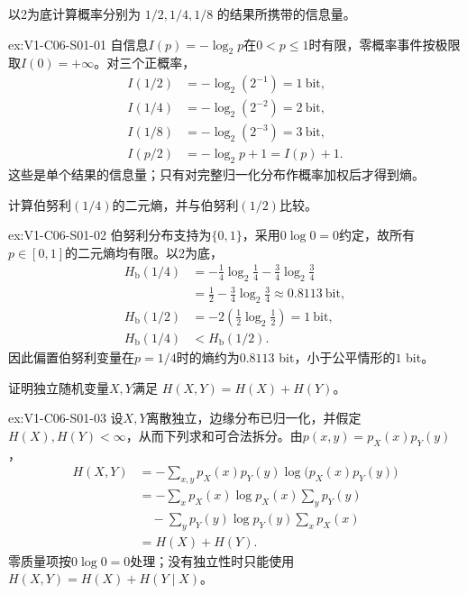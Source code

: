 \begin{SLChapterExercisePairSection}

\begin{exercise}\label{ex:V1-C06-S01-01}
以2为底计算概率分别为 $1/2,1/4,1/8$ 的结果所携带的信息量。
\end{exercise}
\label{sol:V1-C06-S01-01}
\begin{chapterexercisesolution}{ex:V1-C06-S01-01}
自信息$I(p)=-\log_2p$在$0<p\le1$时有限，零概率事件按极限取$I(0)=+\infty$。对三个正概率，
\[
\begin{aligned}
I(1/2)&=-\log_2(2^{-1})=1\ \text{bit},\\
I(1/4)&=-\log_2(2^{-2})=2\ \text{bit},\\
I(1/8)&=-\log_2(2^{-3})=3\ \text{bit},\\
I(p/2)&=-\log_2p+1=I(p)+1.
\end{aligned}
\]
这些是单个结果的信息量；只有对完整归一化分布作概率加权后才得到熵。
\end{chapterexercisesolution}

\begin{exercise}\label{ex:V1-C06-S01-02}
计算伯努利$(1/4)$的二元熵，并与伯努利$(1/2)$比较。
\end{exercise}
\label{sol:V1-C06-S01-02}
\begin{chapterexercisesolution}{ex:V1-C06-S01-02}
伯努利分布支持为$\{0,1\}$，采用$0\log0=0$约定，故所有$p\in[0,1]$的二元熵均有限。以2为底，
\[
\begin{aligned}
H_{\mathrm b}(1/4)
&=-\frac14\log_2\frac14-\frac34\log_2\frac34\\
&=\frac12-\frac34\log_2\frac34
\approx0.8113\ \text{bit},\\
H_{\mathrm b}(1/2)
&=-2\left(\frac12\log_2\frac12\right)=1\ \text{bit},\\
H_{\mathrm b}(1/4)&<H_{\mathrm b}(1/2).
\end{aligned}
\]
因此偏置伯努利变量在$p=1/4$时的熵约为$0.8113$ bit，小于公平情形的$1$ bit。
\end{chapterexercisesolution}

\begin{exercise}\label{ex:V1-C06-S01-03}
证明独立随机变量$X,Y$满足 $H(X,Y)=H(X)+H(Y)$。
\end{exercise}
\label{sol:V1-C06-S01-03}
\begin{chapterexercisesolution}{ex:V1-C06-S01-03}
设$X,Y$离散独立，边缘分布已归一化，并假定$H(X),H(Y)<\infty$，从而下列求和可合法拆分。由$p(x,y)=p_X(x)p_Y(y)$，
\[
\begin{aligned}
H(X,Y)
&=-\sum_{x,y}p_X(x)p_Y(y)
\log\!\bigl(p_X(x)p_Y(y)\bigr)\\
&=-\sum_xp_X(x)\log p_X(x)\sum_yp_Y(y)\\
&\quad-\sum_yp_Y(y)\log p_Y(y)\sum_xp_X(x)\\
&=H(X)+H(Y).
\end{aligned}
\]
零质量项按$0\log0=0$处理；没有独立性时只能使用$H(X,Y)=H(X)+H(Y\mid X)$。
\end{chapterexercisesolution}


\end{SLChapterExercisePairSection}
